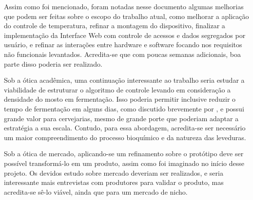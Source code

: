 Assim como foi mencionado, foram notadas nesse documento algumas melhorias que podem ser feitas sobre o escopo do trabalho atual,
como melhorar a aplicação do controle de temperatura, refinar a montagem do dispositivo, finalizar a implementação da Interface
Web com controle de acessos e dados segregados por usuário, e refinar as interações entre hardware e software focando nos requisitos
não funcionais levantados. Acredita-se que com poucas semanas adicionais, boa parte disso poderia ser realizado.

Sob a ótica acadêmica, uma continuação interessante ao trabalho seria estudar a viabilidade de estruturar o algoritmo de controle
levando em consideração a densidade do mosto em fermentação. Isso poderia permitir inclusive reduzir o tempo de fermentação em
alguns dias, como discutido brevemente por , e possui grande valor para cervejarias, mesmo de grande porte 
que poderiam adaptar a estratégia a sua escala. Contudo, para essa abordagem, acredita-se ser necessário um maior compreendimento do 
processo bioquímico e da natureza das leveduras.

Sob a ótica de mercado, aplicando-se um refinamento sobre o protótipo deve ser possível transformá-lo em um produto, assim como
foi imaginado no início desse projeto. Os devidos estudo sobre mercado deveriam ser realizados, e seria interessante mais entrevistas 
com produtores para validar o produto, mas acredita-se sê-lo viável, ainda que para um mercado de nicho.


